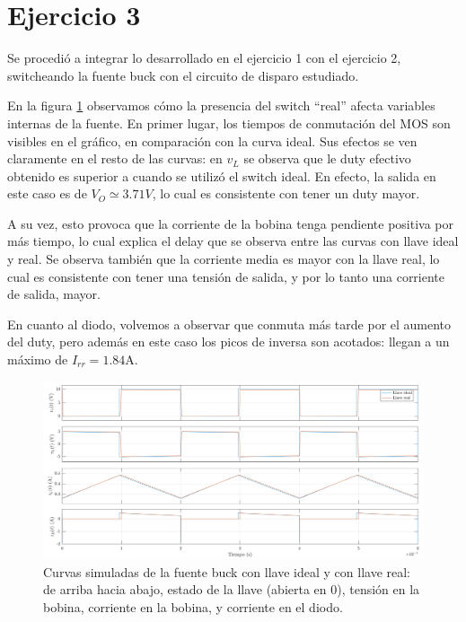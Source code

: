 \documentclass[e4_tp1_main.tex]{subfiles}
\begin{document}
\section{Ejercicio 3}

Se procedi\'o a integrar lo desarrollado en el ejercicio 1 con el ejercicio 2, switcheando la fuente buck con el circuito de disparo estudiado. 

En la figura \ref{fig:curvas3} observamos c\'omo la presencia del switch ``real'' afecta variables internas de la fuente. En primer lugar, los tiempos de conmutaci\'on del MOS son visibles en el gr\'afico, en comparaci\'on con la curva ideal. Sus efectos se ven claramente en el resto de las curvas: en $v_L$ se observa que le duty efectivo obtenido es superior a cuando se utiliz\'o el switch ideal. En efecto, la salida en este caso es de $V_O\simeq3.71V$, lo cual es consistente con tener un duty mayor.

A su vez, esto provoca que la corriente de la bobina tenga pendiente positiva por m\'as tiempo, lo cual explica el delay que se observa entre las curvas con llave ideal y real. Se observa tambi\'en que la corriente media es mayor con la llave real, lo cual es consistente con tener una tensi\'on de salida, y por lo tanto una corriente de salida, mayor.

En cuanto al diodo, volvemos a observar que conmuta m\'as tarde por el aumento del duty, pero adem\'as en este caso los picos de inversa son acotados: llegan a un m\'aximo de $I_{rr}=1.84$A.

\begin{landscape}
	\vspace*{\fill}
	\begin{figure}[ht]
		\centering
		\includegraphics[scale=0.7]{images/ej3/curvas3.png}
		\caption{Curvas simuladas de la fuente buck con llave ideal y con llave real: de arriba hacia abajo, estado de la llave (abierta en 0), tensi\'on en la bobina, corriente en la bobina, y corriente en el diodo.}
		\label{fig:curvas3}
	\end{figure}
	\vspace*{\fill}
\end{landscape}
\end{document}
